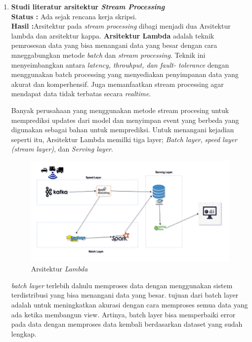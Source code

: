 \documentclass[a4paper,twoside]{article}
\begin{document}
\begin{enumerate}
		

		\item \textbf{Studi literatur arsitektur \textit{Stream Processing}}\\
		{\bf Status :} Ada sejak rencana kerja skripsi.\\
		{\bf Hasil :}Arsitektur pada \textit{stream processing} dibagi menjadi dua Arsitektur lambda
		dan arsitektur kappa.\textbf{ Arsitektur Lambda} adalah teknik pemrosesan data yang bisa 				menangani data yang besar dengan cara mneggabungkan metode \textit{batch} dan \textit{stream 		processing}. Teknik ini menyeimbangkan antara \textit{latency, throuhput, dan fault-					tolerance} dengan menggunakan batch processing yang menyediakan penyimpanan data yang akurat 		dan komperhensif. Juga memanfaatkan stream processing agar mendapat data tidak terbatas 				secara \textit{realtime}.
		
		Banyak perusahaan yang menggunakan metode stream procesing untuk memprediksi updates dari 				model dan menyimpan event yang berbeda yang digunakan sebagai bahan untuk memprediksi. Untuk 		menangani kejadian seperti itu, Arsitektur Lambda memilki tiga layer; \textit{Batch layer}, 			\textit{speed layer (stream layer)}, dan \textit{Serving layer}.
		
		\begin{figure}[H] 
		\centering  
		\includegraphics[scale=0.45]{lambda-architecture}  
		\caption[Gambar Arsitektur { \it Lambda}]{Arsitektur {\it Lambda}} 
		\label{fig:processing-events relationship} 
		\end{figure}
		
		\textit{batch layer} terlebih dahulu memproses data dengan menggunakan sistem 							terdistribusi yang bisa menangani data yang besar. tujuan dari batch layer adalah untuk 				meningkatkan akurasi dengan cara memproses semua data yang ada ketika membangun view. 					Artinya, batch layer bisa memperbaiki error pada data dengan memproses data kembali 					berdasarkan dataset yang sudah lengkap.
		

\end{enumerate}
\end{document}
